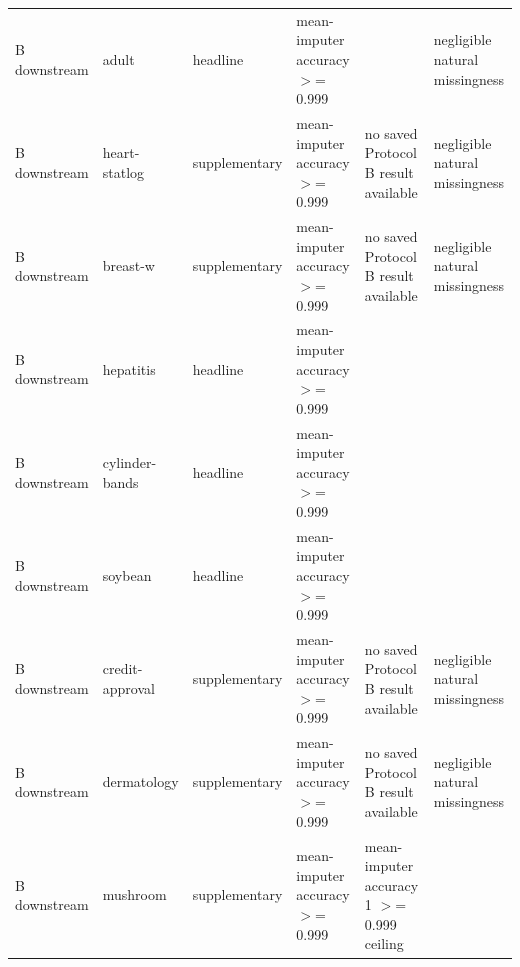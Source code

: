 \begin{table}[ht]
\begin{tabular}{llllll}
 B downstream        & adult                & headline                              & mean-imputer accuracy \ensuremath{>}= 0.999                                   &                                          & negligible natural missingness                                        \\
 B downstream        & heart-statlog        & supplementary                         & mean-imputer accuracy \ensuremath{>}= 0.999                                   & no saved Protocol B result available     & negligible natural missingness                                        \\
 B downstream        & breast-w             & supplementary                         & mean-imputer accuracy \ensuremath{>}= 0.999                                   & no saved Protocol B result available     & negligible natural missingness                                        \\
 B downstream        & hepatitis            & headline                              & mean-imputer accuracy \ensuremath{>}= 0.999                                   &                                          &                                                                       \\
 B downstream        & cylinder-bands       & headline                              & mean-imputer accuracy \ensuremath{>}= 0.999                                   &                                          &                                                                       \\
 B downstream        & soybean              & headline                              & mean-imputer accuracy \ensuremath{>}= 0.999                                   &                                          &                                                                       \\
 B downstream        & credit-approval      & supplementary                         & mean-imputer accuracy \ensuremath{>}= 0.999                                   & no saved Protocol B result available     & negligible natural missingness                                        \\
 B downstream        & dermatology          & supplementary                         & mean-imputer accuracy \ensuremath{>}= 0.999                                   & no saved Protocol B result available     & negligible natural missingness                                        \\
 B downstream        & mushroom             & supplementary                         & mean-imputer accuracy \ensuremath{>}= 0.999                                   & mean-imputer accuracy 1 \ensuremath{>}= 0.999 ceiling &                                                                       \\

\end{tabular}
\end{table}
